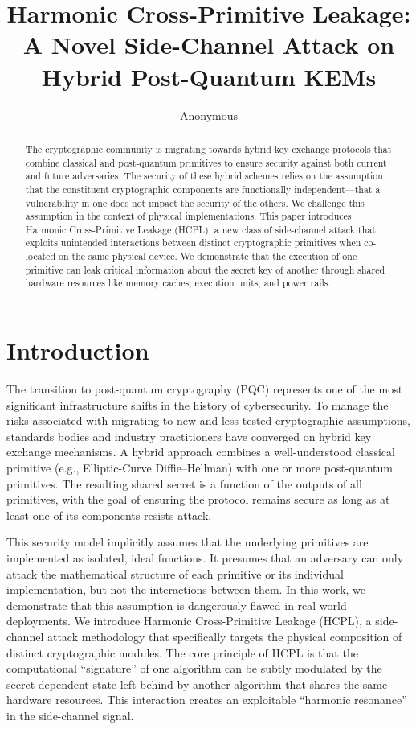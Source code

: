 \documentclass[runningheads]{llncs}
\begin{document}
\title{Harmonic Cross-Primitive Leakage: A Novel Side-Channel Attack on Hybrid Post-Quantum KEMs}
\author{Anonymous}
\institute{}
\maketitle

\begin{abstract}
The cryptographic community is migrating towards hybrid key exchange protocols that combine classical and post-quantum primitives to ensure security against both current and future adversaries. The security of these hybrid schemes relies on the assumption that the constituent cryptographic components are functionally independent---that a vulnerability in one does not impact the security of the others. We challenge this assumption in the context of physical implementations. This paper introduces Harmonic Cross-Primitive Leakage (HCPL), a new class of side-channel attack that exploits unintended interactions between distinct cryptographic primitives when co-located on the same physical device. We demonstrate that the execution of one primitive can leak critical information about the secret key of another through shared hardware resources like memory caches, execution units, and power rails.
\end{abstract}

\section{Introduction}
The transition to post-quantum cryptography (PQC) represents one of the most significant infrastructure shifts in the history of cybersecurity. To manage the risks associated with migrating to new and less-tested cryptographic assumptions, standards bodies and industry practitioners have converged on hybrid key exchange mechanisms. A hybrid approach combines a well-understood classical primitive (e.g., Elliptic-Curve Diffie--Hellman) with one or more post-quantum primitives. The resulting shared secret is a function of the outputs of all primitives, with the goal of ensuring the protocol remains secure as long as at least one of its components resists attack.

This security model implicitly assumes that the underlying primitives are implemented as isolated, ideal functions. It presumes that an adversary can only attack the mathematical structure of each primitive or its individual implementation, but not the interactions between them. In this work, we demonstrate that this assumption is dangerously flawed in real-world deployments. We introduce Harmonic Cross-Primitive Leakage (HCPL), a side-channel attack methodology that specifically targets the physical composition of distinct cryptographic modules. The core principle of HCPL is that the computational ``signature'' of one algorithm can be subtly modulated by the secret-dependent state left behind by another algorithm that shares the same hardware resources. This interaction creates an exploitable ``harmonic resonance'' in the side-channel signal.
\end{document}
